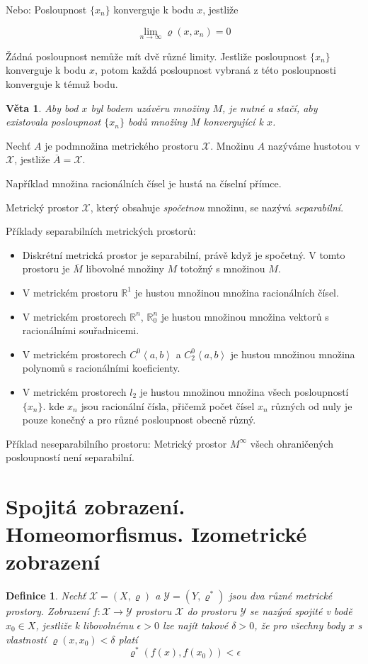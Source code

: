 \documentclass[a4paper, 11pt]{report}
\newtheorem{mydef}{Definice}[chapter]
\newtheorem{veta}{Věta}[chapter]
\begin{document}
Nebo: Posloupnost $\{x_n\}$ konverguje k bodu $x$, jestliže

$$\lim\limits_{n\to \infty} \varrho(x, x_n) = 0 $$

Žádná posloupnost nemůže mít dvě různé limity. Jestliže posloupnost $\{x_n\}$ konverguje k bodu $x$, potom každá posloupnost vybraná z této posloupnosti konverguje k témuž bodu.

\begin{veta}
Aby bod $x$ byl bodem uzávěru množiny $M$, je nutné a stačí, aby existovala posloupnost $\{x_n\}$ bodů množiny $M$ konvergující k $x$.
\end{veta}

Nechť $A$ je podmnožina metrického prostoru $\mathcal{X}$. Množinu $A$ nazýváme hustotou v $\mathcal{X}$, jestliže $\overline{A} = \mathcal{X}$.

Například množina racionálních čísel je hustá na číselní přímce.

Metrický prostor $\mathcal{X}$, který obsahuje \emph{spočetnou} množinu, se nazývá \emph{separabilní}.

Příklady separabilních metrických prostorů:
\begin{itemize}
	\item Diskrétní metrická prostor je separabilní, právě když je spočetný. V tomto prostoru je $\overline{M}$ libovolné množiny $M$ totožný s množinou $M$.
	\item V metrickém prostoru $\mathbb{R}^1$ je hustou množinou množina racionálních čísel.
	\item V metrickém prostorech $\mathbb{R}^n$, $\mathbb{R}^n_0$ je hustou množinou množina vektorů s racionálními souřadnicemi.
	\item V metrickém prostorech $C^0\left<a, b\right>$ a $C_2^0\left<a, b\right>$ je hustou množinou množina polynomů s racionálními koeficienty.
	\item V metrickém prostorech $l_2$ je hustou množinou množina všech posloupností $\{x_n\}$. kde $x_n$ jsou racionální čísla, přičemž počet čísel $x_n$ různých od nuly je pouze konečný a pro různé posloupnost obecně různý.
\end{itemize}

Příklad neseparabilního prostoru: Metrický prostor $M^\infty$ všech ohraničených posloupností není separabilní.

\section{Spojitá zobrazení. Homeomorfismus. Izometrické zobrazení}
\begin{mydef}
Nechť $\mathcal{X} = (X, \varrho)$ a $\mathcal{Y} = (Y, \varrho^*)$ jsou dva různé metrické prostory. Zobrazení $f: \mathcal{X} \to \mathcal{Y}$ prostoru $\mathcal{X}$ do prostoru $\mathcal{Y}$ se nazývá spojité v bodě $x_0 \in X$, jestliže k libovolnému $\epsilon > 0$ lze najít takové $\delta > 0$, že pro všechny body $x$ s vlastností $\varrho(x, x_0) < \delta$ platí
$$\varrho^*(f(x), f(x_0)) < \epsilon$$
\end{mydef}
\end{document}

